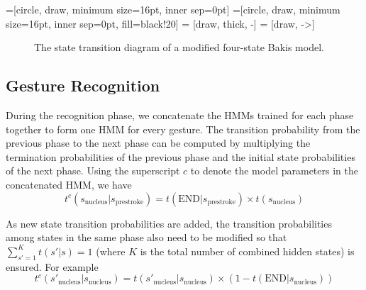 \documentclass{acm_proc_article-sp}
\begin{document}
=[circle, draw, minimum size=16pt, inner sep=0pt]
=[circle, draw, minimum size=16pt, inner
sep=0pt, fill=black!20] 
 = [draw, thick, -]
 = [draw, ->]

\begin{figure}[tb]
\centering
  \caption{The state transition diagram of a modified four-state Bakis model.}
  \label{fig:bakis}
\end{figure}

\subsection{Gesture Recognition}
During the recognition phase, we concatenate the HMMs trained for each phase together to form
one HMM for every gesture. The transition probability from the previous phase to the next
phase can be computed by multiplying the termination probabilities of the previous phase and the
initial state probabilities of the next phase. Using the superscript $c$ to denote the model
parameters in the concatenated HMM, we have
\begin{displaymath}
t^c(s_\text{nucleus}|s_\text{prestroke}) = t(\text{END}|s_\text{prestroke}) \times t(s_\text{nucleus})
\end{displaymath}

As new state transition probabilities are added, the transition probabilities among
states in the same phase also need to be modified so that $\sum_{s' = 1}^K t(s'|s) = 1$ (where
$K$ is the total number of combined hidden states) is ensured. For example
\begin{displaymath}
t^c(s'_{\text{nucleus}} | s_{\text{nucleus}}) = t(s'_{\text{nucleus}} | s_{\text{nucleus}})
  \times (1 - t(\text{END} | s_{\text{nucleus}}))
\end{displaymath}
\end{document}
